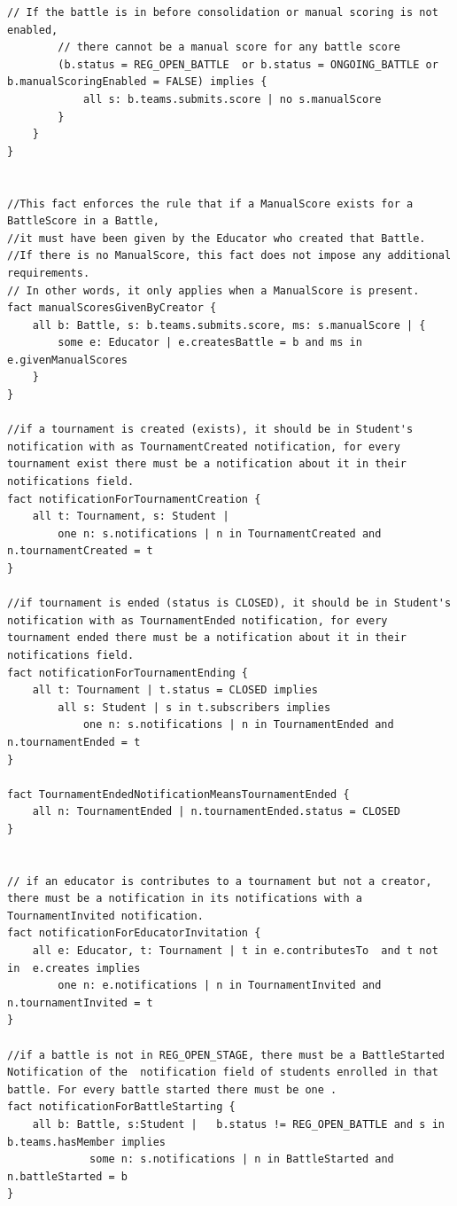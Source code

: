 \begin{lstlisting}[language=alloy]
        // If the battle is in before consolidation or manual scoring is not enabled,
        // there cannot be a manual score for any battle score
        (b.status = REG_OPEN_BATTLE  or b.status = ONGOING_BATTLE or b.manualScoringEnabled = FALSE) implies {
            all s: b.teams.submits.score | no s.manualScore
        }
    }
}


//This fact enforces the rule that if a ManualScore exists for a BattleScore in a Battle, 
//it must have been given by the Educator who created that Battle. 
//If there is no ManualScore, this fact does not impose any additional requirements.
// In other words, it only applies when a ManualScore is present.
fact manualScoresGivenByCreator {
    all b: Battle, s: b.teams.submits.score, ms: s.manualScore | {
        some e: Educator | e.createsBattle = b and ms in e.givenManualScores
    }
}

//if a tournament is created (exists), it should be in Student's notification with as TournamentCreated notification, for every tournament exist there must be a notification about it in their notifications field.
fact notificationForTournamentCreation {
    all t: Tournament, s: Student | 
        one n: s.notifications | n in TournamentCreated and n.tournamentCreated = t
}

//if tournament is ended (status is CLOSED), it should be in Student's notification with as TournamentEnded notification, for every tournament ended there must be a notification about it in their notifications field.
fact notificationForTournamentEnding {
    all t: Tournament | t.status = CLOSED implies 
        all s: Student | s in t.subscribers implies 
            one n: s.notifications | n in TournamentEnded and n.tournamentEnded = t
}

fact TournamentEndedNotificationMeansTournamentEnded {
    all n: TournamentEnded | n.tournamentEnded.status = CLOSED
}


// if an educator is contributes to a tournament but not a creator, there must be a notification in its notifications with a TournamentInvited notification. 
fact notificationForEducatorInvitation {
    all e: Educator, t: Tournament | t in e.contributesTo  and t not in  e.creates implies
        one n: e.notifications | n in TournamentInvited and n.tournamentInvited = t
}

//if a battle is not in REG_OPEN_STAGE, there must be a BattleStarted Notification of the  notification field of students enrolled in that battle. For every battle started there must be one .
fact notificationForBattleStarting {
    all b: Battle, s:Student |	 b.status != REG_OPEN_BATTLE and s in b.teams.hasMember implies 
             some n: s.notifications | n in BattleStarted and n.battleStarted = b
}



\end{lstlisting}
